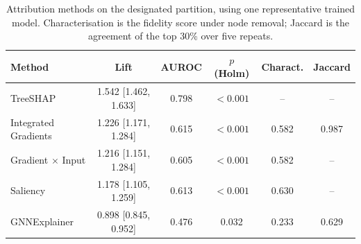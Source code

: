 \begin{table}[htbp]
\centering
\caption{Attribution methods on the designated partition, using one representative trained model. Characterisation is the fidelity score under node removal; Jaccard is the agreement of the top 30\% over five repeats.}
\label{tab:si_explainers}
\footnotesize
\setlength{\tabcolsep}{4pt}
\begin{tabular}{lccccc}
\toprule
Method & Lift & AUROC & $p$ (Holm) & Charact. & Jaccard \\
\midrule
TreeSHAP & 1.542 [1.462, 1.633] & 0.798 & $<0.001$ & -- & -- \\
Integrated Gradients & 1.226 [1.171, 1.284] & 0.615 & $<0.001$ & 0.582 & 0.987 \\
Gradient $\times$ Input & 1.216 [1.151, 1.284] & 0.605 & $<0.001$ & 0.582 & -- \\
Saliency & 1.178 [1.105, 1.259] & 0.613 & $<0.001$ & 0.630 & -- \\
GNNExplainer & 0.898 [0.845, 0.952] & 0.476 & 0.032 & 0.233 & 0.629 \\
\bottomrule
\end{tabular}
\end{table}

